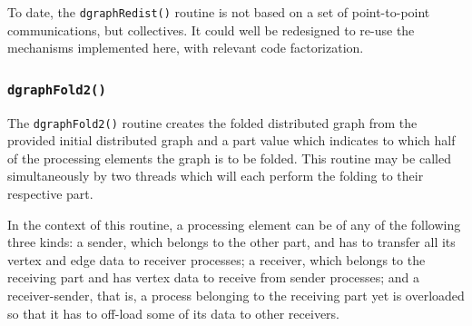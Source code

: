 To date, the \texttt{dgraph\lbt Redist()} routine is not based on a
set of point-to-point communications, but collectives. It could well
be redesigned to re-use the mechanisms implemented here, with relevant
code factorization.

\subsubsection{\texttt{dgraphFold2()}}

The \texttt{dgraphFold2()} routine creates the folded distributed
graph from the provided initial distributed graph and a part value
which indicates to which half of the processing elements the graph
is to be folded. This routine may be called simultaneously by two
threads which will each perform the folding to their respective part.

In the context of this routine, a processing element can be of any of
the following three kinds: a sender, which belongs to the other part,
and has to transfer all its vertex and edge data to receiver
processes; a receiver, which belongs to the receiving part and has
vertex data to receive from sender processes; and a receiver-sender,
that is, a process belonging to the receiving part yet is
overloaded so that it has to off-load some of its data to other
receivers.

